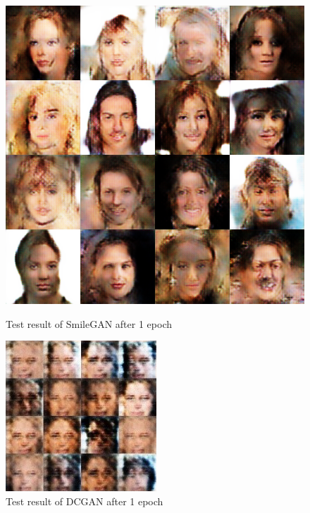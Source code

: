 \begin{figure}
    \begin{minipage}[t]{0.48\linewidth}
        \centering
        \includegraphics[width=\textwidth]{figures/result_smilegan_e1.png}
        \caption{Test result of SmileGAN after 1 epoch}
        \label{smilegan_e1}
    \end{minipage}
        \hfill
    \begin{minipage}[t]{0.48\linewidth}
        \centering
        \includegraphics[width=\textwidth]{figures/result_dcgan_e1.png}
        \caption{Test result of DCGAN after 1 epoch}
        \label{dcgan_e1}
    \end{minipage}
\end{figure}

